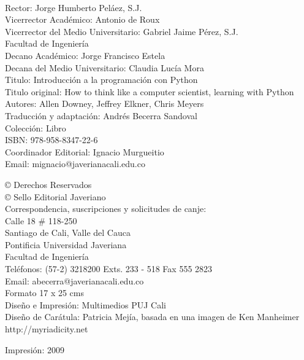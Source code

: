 \documentclass[letterpaper,twoside,10pt]{book}
\newcommand{\introprog}{Introducción a la programación con Python}
\begin{document}
\parindent0pt
{\tiny \ }

{\scriptsize 
Rector: Jorge Humberto Peláez, S.J.\\
Vicerrector Académico: Antonio de Roux\\
Vicerrector del Medio Universitario: Gabriel Jaime Pérez, S.J.\\

Facultad de Ingeniería\\
Decano Académico: Jorge Francisco Estela \\
Decana del Medio Universitario: Claudia Lucía Mora \\


Titulo:  \introprog \\
Titulo original: How to think like a computer scientist, learning with Python
Autores: Allen Downey, Jeffrey Elkner, Chris Meyers \\
Traducción y adaptación: Andrés Becerra Sandoval \\
Colección: Libro\\

ISBN: 978-958-8347-22-6 \\

Coordinador Editorial: Ignacio Murgueitio\\
Email: mignacio@javerianacali.edu.co

© Derechos Reservados\\
© Sello Editorial Javeriano\\

Correspondencia, suscripciones y solicitudes de canje:\\
Calle 18 \# 118-250\\
Santiago de Cali, Valle del Cauca\\
Pontificia Universidad Javeriana\\
Facultad de Ingeniería\\
Teléfonos: (57-2) 3218200 Exts. 233 - 518 Fax 555 2823\\
Email: abecerra@javerianacali.edu.co \\

Formato 17  x  25 cms\\
Diseño e Impresión: Multimedios PUJ Cali\\

Diseño de Carátula: 
Patricia Mejía, basada en una imagen de Ken Manheimer \\
http://myriadicity.net

Impresión: 2009
}
\newpage
\thispagestyle{empty}
\vspace{0.25in}
\end{document}
